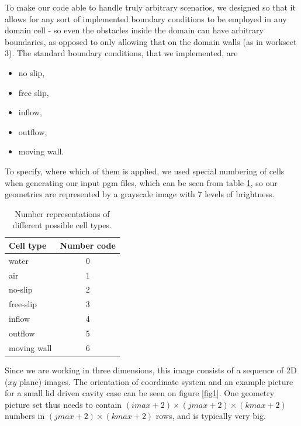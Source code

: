\documentclass[a4paper, 12pt]{article}
\begin{document}
To make our code able to handle truly arbitrary scenarios, we designed so that it allows for any sort of implemented boundary conditions to be employed in any
domain cell - so even the obstacles inside the domain can have arbitrary boundaries, as opposed to only allowing that on the domain walls (as in workseet 3).
The standard boundary conditions, that we implemented, are
\begin{itemize}
\item no slip,
\item free slip,
\item inflow,
\item outflow,
\item moving wall.
\end{itemize}
To specify, where which of them is applied, we used special numbering of cells when generating our input pgm files, which can be seen from table
\ref{tab1}, so our geometries are represented by a grayscale image with 7 levels of brightness.
\begin{table}
\centering
\label{tab1}
\begin{tabular}{|l|c|}
\hline
{\bf Cell type} & {\bf Number code}\\
\hline
water & 0 \\
air & 1 \\
no-slip & 2 \\
free-slip & 3 \\
inflow & 4 \\
outflow & 5 \\
moving wall & 6 \\
\hline
\end{tabular}
\caption{Number representations of different possible cell types.}
\end{table}
Since we are working in three dimensions, this image consists of a sequence of 2D ($xy$ plane) images. The orientation of coordinate system and an
example picture for a small lid driven cavity case can be seen on figure \ref{fig1}. One geometry picture set thus needs to contain
$(imax+2)\times(jmax+2)\times(kmax+2)$ numbers in $(jmax+2)\times(kmax+2)$ rows, and is typically very big.
\end{document}
